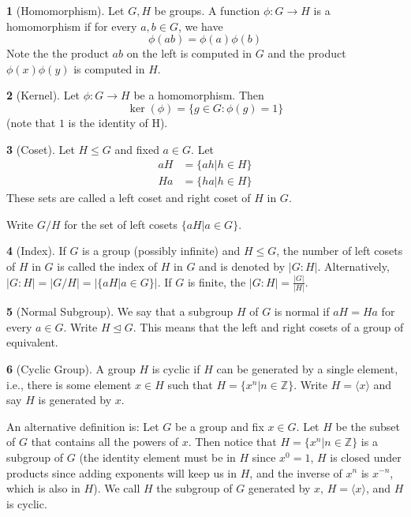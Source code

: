 \documentclass[12pt]{article}
\theoremstyle{definition}
\newtheorem{definition}{\color{NavyBlue}{\textbf{Definition}}}
\begin{document}
\begin{definition}[Homomorphism]
Let $G, H$ be groups. A function $\phi : G \to H$ is a homomorphism if for every $a,b \in G$, we have
\begin{equation}
\phi(ab) = \phi(a)\phi(b)
\end{equation}
Note the the product $ab$ on the left is computed in $G$ and the product $\phi(x)\phi(y)$ is computed in $H$.
\end{definition}

\begin{definition}[Kernel]
Let $\phi:G \to H$ be a homomorphism. Then
\begin{equation}
\ker(\phi) = \{g \in G : \phi(g) = 1 \}
\end{equation}
(note that $1$ is the identity of H).
\end{definition}

\begin{definition}[Coset]
Let $H \leq G$ and fixed $a \in G$. Let
\begin{align*}
aH &= \{ ah | h \in H \} \\
Ha &= \{ ha | h \in H \}
\end{align*}
These sets are called a left coset and right coset of $H$ in $G$.

Write $G/H$ for the set of left cosets $\{aH | a \in G \}$.
\end{definition}

\begin{definition}[Index]
If $G$ is a group (possibly infinite) and $H \leq G$, the number of left cosets of $H$ in $G$ is called the index of $H$ in $G$ and is denoted by $|G : H|$. Alternatively, $|G : H| = | G / H | =  |\{aH | a \in G\} |$. If $G$ is finite, the $|G:H| = \frac{|G|}{|H|}$.
\end{definition}

\begin{definition}[Normal Subgroup]
We say that a subgroup $H$ of $G$ is normal if $aH = Ha$ for every $a \in G$. Write $H \trianglelefteq G$. This means that the left and right cosets of a group of equivalent.
\end{definition}

\begin{definition}[Cyclic Group]
A group $H$ is cyclic if $H$ can be generated by a single element, i.e., there is some element $x \in H$ such that $H = \{x^n | n \in \mathbb{Z} \}$. Write $H  = \langle x \rangle$ and say $H$ is generated by $x$.

An alternative definition is: Let $G$ be a group and fix $x \in G$. Let $H$ be the subset of $G$ that contains all the powers of $x$. Then notice that $H = \{x^n | n \in \mathbb{Z} \}$ is a subgroup of $G$ (the identity element must be in $H$ since $x^0 = 1$, $H$ is closed under products since adding exponents will keep us in $H$, and the inverse of $x^n$ is $x^{-n}$, which is also in $H$). We call $H$ the subgroup of $G$ generated by $x$, $H = \langle x \rangle$, and $H$ is cyclic.
\end{definition}
\end{document}

